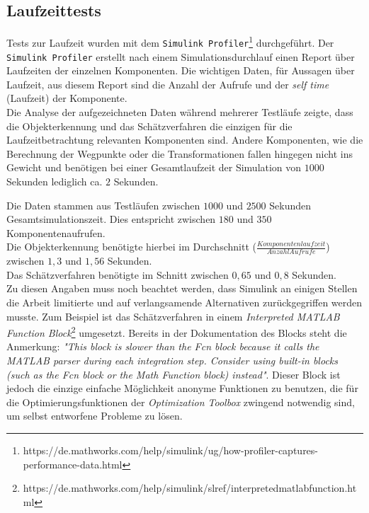 \subsection{Laufzeittests}
\label{sec_laufzeit}
Tests zur Laufzeit wurden mit dem \texttt{Simulink Profiler}\footnote{https://de.mathworks.com/help/simulink/ug/how-profiler-captures-performance-data.html} durchgeführt. Der \texttt{Simulink Profiler} erstellt nach einem Simulationsdurchlauf einen Report über Laufzeiten der einzelnen Komponenten. Die wichtigen Daten, für Aussagen über Laufzeit, aus diesem Report sind die Anzahl der Aufrufe und der \textit{self time} (Laufzeit) der Komponente.\\
Die Analyse der aufgezeichneten Daten während mehrerer Testläufe zeigte, dass die Objekterkennung und das Schätzverfahren die einzigen für die Laufzeitbetrachtung relevanten Komponenten sind. Andere Komponenten, wie die Berechnung der Wegpunkte oder die Transformationen fallen hingegen nicht ins Gewicht und benötigen bei einer Gesamtlaufzeit der Simulation von $1000$ Sekunden lediglich ca. $2$ Sekunden. 

Die Daten stammen aus Testläufen zwischen $1000$ und $2500$ Sekunden Gesamtsimulationszeit. Dies entspricht zwischen $180$ und $350$ Komponentenaufrufen.\\
Die Objekterkennung benötigte hierbei im Durchschnitt ($\frac{Komponentenlaufzeit}{Anzahl Aufrufe}$) zwischen $1,3$ und $1,56$ Sekunden.\\
Das Schätzverfahren benötigte im Schnitt zwischen $0,65$ und $0,8$ Sekunden.\\

Zu diesen Angaben muss noch beachtet werden, dass Simulink an einigen Stellen die Arbeit limitierte und auf verlangsamende Alternativen zurückgegriffen werden musste. Zum Beispiel ist das Schätzverfahren in einem \textit{Interpreted MATLAB Function Block}\footnote{https://de.mathworks.com/help/simulink/slref/interpretedmatlabfunction.html} umgesetzt. Bereits in der Dokumentation des Blocks steht die Anmerkung: \textit{"This block is slower than the Fcn block because it calls the MATLAB parser during each integration step. Consider using built-in blocks (such as the Fcn block or the Math Function block) instead"}. Dieser Block ist jedoch die einzige einfache Möglichkeit anonyme Funktionen zu benutzen, die für die Optimierungsfunktionen der \textit{Optimization Toolbox} zwingend notwendig sind, um selbst entworfene Probleme zu lösen.

%
